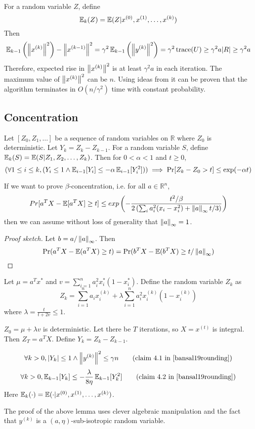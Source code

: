 For a random variable $Z$, define
\[ \operatorname{\mathbb{E}}_k(Z) = \operatorname{\mathbb{E}}(Z | x^{(0)}, x^{(1)}, \ldots, x^{(k)}) \]
Then
\[ \operatorname{\mathbb{E}}_{k-1}\left(\left\lVert x^{(k)} \right\rVert^2\right) - \left\lVert x^{(k-1)} \right\rVert^2
= \gamma^2 \operatorname{\mathbb{E}}_{k-1}\left(\left\lVert y^{(k)} \right\rVert^2\right)
= \gamma^2 \operatorname*{trace}(U) \ge \gamma^2 a |R| \ge \gamma^2 a \]
Therefore, expected rise in $\left\lVert x^{(k)} \right\rVert^2$ is at least $\gamma^2 a$ in each iteration.
The maximum value of $\left\lVert x^{(k)} \right\rVert^2$ can be $n$.
Using ideas from \cite{bansal10cadm} it can be proven that the algorithm terminates
in $O(n/\gamma^2)$ time with constant probability.

\subsection{Concentration}

\begin{theorem}
\label{thm:freedman}
Let $[Z_0, Z_1, \ldots]$ be a sequence of random variables on $\mathbb{R}$
where $Z_0$ is deterministic. Let $Y_k = Z_k - Z_{k-1}$.
For a random variable $S$, define $\operatorname{\mathbb{E}}_k(S) = \operatorname{\mathbb{E}}(S | Z_1, Z_2, \ldots, Z_k)$.
Then for $0 < \alpha < 1$ and $t \ge 0$,
\[ (\forall 1 \le i \le k, (Y_i \le 1 \wedge \operatorname{\mathbb{E}}_{i-1}[Y_i] \le -\alpha\operatorname{\mathbb{E}}_{i-1}[Y_i^2]))
\implies \Pr[Z_k - Z_0 > t] \le \exp(-\alpha t) \]
\end{theorem}

\begin{lemma}
If we want to prove $\beta$-concentration, i.e. for all $a \in \mathbb{R}^n$,
\[ Pr[a^T X - \operatorname{\mathbb{E}}[a^T X] \ge t] \leq exp\left(-\frac{t^2/\beta}{
2\left(\sum_i a_i^2(x_i - x_i^2) + \left\lVert a \right\rVert_{\infty}t/3\right)}\right) \]
then we can assume without loss of generality that $\left\lVert a \right\rVert_{\infty} = 1$.
\end{lemma}
\begin{proof}[Proof sketch]
Let $b = a/\left\lVert a \right\rVert_{\infty}$. Then
\[ \Pr(a^TX - \operatorname{\mathbb{E}}(a^TX) \ge t) = \Pr(b^TX - \operatorname{\mathbb{E}}(b^TX) \ge t/\left\lVert a \right\rVert_{\infty}) \]
\end{proof}

Let $\mu = a^Tx^*$ and $v = \sum_{i=1}^n a_i^2x_i^*(1-x_i^*)$.
Define the random variable $Z_k$ as
\[ Z_k = \sum_{i=1}^n a_ix^{(k)}_i + \lambda\sum_{i=1}^n a_i^2x^{(k)}_i(1-x^{(k)}_i) \]
where $\lambda = \frac{t}{t+2v} \le 1$.

$Z_0 = \mu + \lambda v$ is deterministic.
Let there be $T$ iterations, so $X = x^{(t)}$ is integral.
Then $Z_T = a^TX$. Define $Y_k = Z_k - Z_{k-1}$.

\begin{lemma}
\[ \forall k > 0, \abs{Y_k} \le 1 \wedge \norm{y^{(k)}}^2 \le \gamma n
\tag{claim 4.1 in \cite{bansal19rounding}} \]
\[ \forall k > 0, \E_{k-1}[Y_k] \le -\frac{\lambda}{8\eta} \E_{k-1}[Y_k^2]
\tag{claim 4.2 in \cite{bansal19rounding}} \]
Here $\operatorname{\mathbb{E}}_k(\cdot) = \operatorname{\mathbb{E}}(\cdot | x^{(0)}, x^{(1)}, \ldots, x^{(k)})$.
\end{lemma}
The proof of the above lemma uses clever algebraic manipulation
and the fact that $y^{(k)}$ is a $(a, \eta)$-sub-isotropic random variable.

